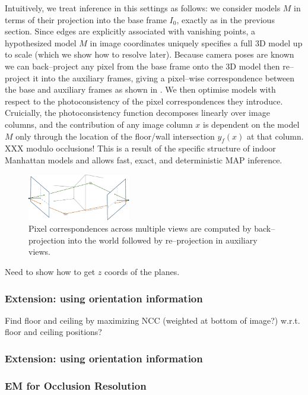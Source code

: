\documentclass{article}
\begin{document}
Intuitively, we treat inference in this settings as follows: we
consider models $M$ in terms of their projection into the base frame
$I_0$, exactly as in the previous section. Since edges are explicitly
associated with vanishing points, a hypothesized model $M$ in image
coordinates uniquely specifies a full 3D model up to scale (which we
show how to resolve later). Because camera poses are known we can
back--project any pixel from the base frame onto the 3D model then
re--project it into the auxiliary frames, giving a pixel--wise
correspondence between the base and auxiliary frames as shown in
. We then optimise models with respect to the
photoconsistency of the pixel correspondences they
introduce. Cruicially, the photoconsistency function decomposes
linearly over image columns, and the contribution of any image column
$x$ is dependent on the model $M$ only through the location of the
floor/wall intersection $y_f(x)$ at that column. XXX modulo
occlusions! This is a result of the specific structure of indoor
Manhattan models and allows fast, exact, and deterministic MAP
inference.

\begin{figure}[tb]
  \centering \includegraphics[width=0.4\textwidth]{figures/backproject}
  \caption{Pixel correspondences across multiple views are computed by
    back--projection into the world followed by re--projection in
    auxiliary views.}
  \label{fig:backproject}
\end{figure}

Need to show how to get $z$ coords of the planes.

\subsubsection{Extension: using orientation information}
Find floor and ceiling by maximizing NCC (weighted at bottom of
image?) w.r.t. floor and ceiling positions?

\subsubsection{Extension: using orientation information}

\subsubsection{EM for Occlusion Resolution}
\end{document}
